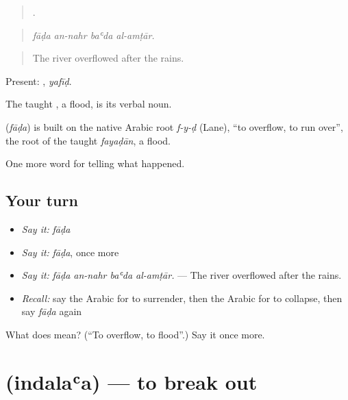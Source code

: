 \begin{quote}
   .
\end{quote}

\begin{quote}
\emph{fāḍa an-nahr baʿda al-amṭār.}
\end{quote}

\begin{quote}
The river overflowed after the rains.
\end{quote}

Present: , \emph{yafīḍ}.

The taught , a flood, is its verbal noun.

\begin{cousinweb}
\textbf{} (\emph{fāḍa}) is built on the native Arabic root \emph{f-y-ḍ} (Lane), \textquotedblleft{}to overflow, to run over\textquotedblright{}, the root of the taught \emph{fayaḍān}, a flood.
\end{cousinweb}

\begin{grammarlens}[title={What you've built}]
One more word for telling what happened.
\end{grammarlens}

\subsection*{Your turn}
\begin{itemize}
\raggedright
  \item \emph{Say it:} \emph{fāḍa}
  \item \emph{Say it:} \emph{fāḍa}, once more
  \item \emph{Say it:} \emph{fāḍa an-nahr baʿda al-amṭār.} — The river overflowed after the rains.
  \item \emph{Recall:} say the Arabic for to surrender, then the Arabic for to collapse, then say \emph{fāḍa} again
\end{itemize}

\begin{tcolorbox}[breakable,colback=teal!4,colframe=teal!35!black,title={Before you move on}]
What does  mean? (\textquotedblleft{}To overflow, to flood\textquotedblright{}.) Say it once more.
\end{tcolorbox}
\section[\texorpdfstring{\ar{اندلع} (indalaʿa)}{اندلع (indalaʿa)}]{ (indalaʿa) — to break out}

